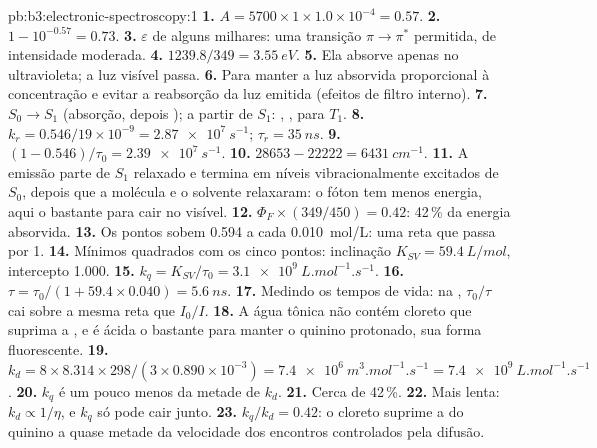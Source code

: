 \begin{solution}{pb:b3:electronic-spectroscopy:1}
\textbf{1.} $A = 5700 \times 1 \times 1.0\times10^{-4} = 0.57$.
\textbf{2.} $1 - 10^{-0.57} = 0.73$.
\textbf{3.} $\varepsilon$ de alguns milhares: uma transição $\pi\to\pi^*$ permitida, de
intensidade moderada.
\textbf{4.} $1239.8/349 = \qty{3.55}{eV}$.
\textbf{5.} Ela absorve apenas no ultravioleta; a luz visível passa.
\textbf{6.} Para manter a luz absorvida proporcional à concentração e evitar a
reabsorção da luz emitida (efeitos de filtro interno).
\textbf{7.} $S_0 \to S_1$ (absorção, depois ); a partir de $S_1$:
, ,  para $T_1$.
\textbf{8.} $k_r = 0.546/19 \times 10^{-9} = \qty{2.87e7}{s^{-1}}$; $\tau_r = \qty{35}{ns}$.
\textbf{9.} $(1 - 0.546)/\tau_0 = \qty{2.39e7}{s^{-1}}$.
\textbf{10.} $28653 - 22222 = \qty{6431}{cm^{-1}}$.
\textbf{11.} A emissão parte de $S_1$ relaxado e termina em níveis vibracionalmente
excitados de $S_0$, depois que a molécula e o solvente relaxaram: o fóton tem menos
energia, aqui o bastante para cair no visível.
\textbf{12.} $\Phi_F \times (349/450) = 0.42$: 42\,\% da energia absorvida.
\textbf{13.} Os pontos sobem 0.594 a cada \qty{0.010}{mol/L}: uma reta que passa por 1.
\textbf{14.} Mínimos quadrados com os cinco pontos: inclinação $K_{SV} = \qty{59.4}{L/mol}$,
intercepto 1.000.
\textbf{15.} $k_q = K_{SV}/\tau_0 = \qty{3.1e9}{L.mol^{-1}.s^{-1}}$.
\textbf{16.} $\tau = \tau_0/(1 + 59.4 \times 0.040) = \qty{5.6}{ns}$.
\textbf{17.} Medindo os tempos de vida: na , $\tau_0/\tau$ cai sobre a
mesma reta que $I_0/I$.
\textbf{18.} A água tônica não contém cloreto que suprima a , e é ácida o
bastante para manter o quinino protonado, sua forma fluorescente.
\textbf{19.} $k_d = 8 \times 8.314 \times 298/(3 \times 0.890\times10^{-3}) =
\qty{7.4e6}{m^3.mol^{-1}.s^{-1}} = \qty{7.4e9}{L.mol^{-1}.s^{-1}}$.
\textbf{20.} $k_q$ é um pouco menos da metade de $k_d$.
\textbf{21.} Cerca de 42\,\%.
\textbf{22.} Mais lenta: $k_d \propto 1/\eta$, e $k_q$ só pode cair junto.
\textbf{23.} \textbf{$k_q/k_d = 0.42$}: o cloreto suprime a  do quinino a quase
metade da velocidade dos encontros controlados pela difusão.
\end{solution}
